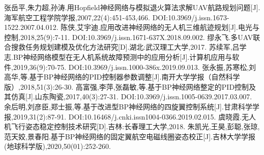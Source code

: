 \documentclass[UTF8,a4paper,10pt,nocolorlinks]{ctexart}
\begin{document}
    

\renewcommand{\refname}{参考文献}   %
\begin{thebibliography}{99}
\addtolength{\itemsep}{-2ex} %
张岳平,朱力超,孙涛.用Hopfield神经网络与模拟退火算法求解UAV航路规划问题[J].海军航空工程学院学报,2007,22(4):451-453,466. DOI:10.3969/j.issn.1673-1522.2007.04.012.
陈侠,艾宇迪.应用改进神经网络的无人机三维航迹规划[J].电光与控制,2018,25(9):7-11. DOI:10.3969/j.issn.1671-637X.2018.09.002.
缪永飞.多UAV联合搜救任务规划建模及优化方法研究[D].湖北:武汉理工大学,2017.
苏续军,吕学志.BP神经网络模型在无人机系统故障预测中的应用分析[J].计算机应用与软件,2019,36(9):70-75. DOI:10.3969/j.issn.1000-386x.2019.09.013.
张永振,苏寒松,刘高华,等.基于BP神经网络的PID控制器参数调整[J].南开大学学报（自然科学版）,2018,51(3):26-30.
高富强,李萍,张磊敏,等.基于BP神经网络整定的PID控制及其仿真[J].山东陶瓷,2017,40(3):27-31. DOI:10.3969/j.issn.1005-0639.2017.03.007.
余后明,刘彦臣,郑士振,等.基于改进型BP神经网络的四旋翼控制系统[J].甘肃科学学报,2019,31(2):87-91. DOI:10.16468/j.cnki.issn1004-0366.2019.02.015.
虞晓霞.无人机飞行姿态稳定控制技术研究[D].吉林:长春理工大学,2018.
朱凯光,王昊,彭聪,张琼,范天姣,景春阳.基于BP神经网络的固定翼航空电磁线圈姿态校正[J].吉林大学学报(地球科学版),2020,50(01):252-260.

\end{thebibliography}  
\end{document}
